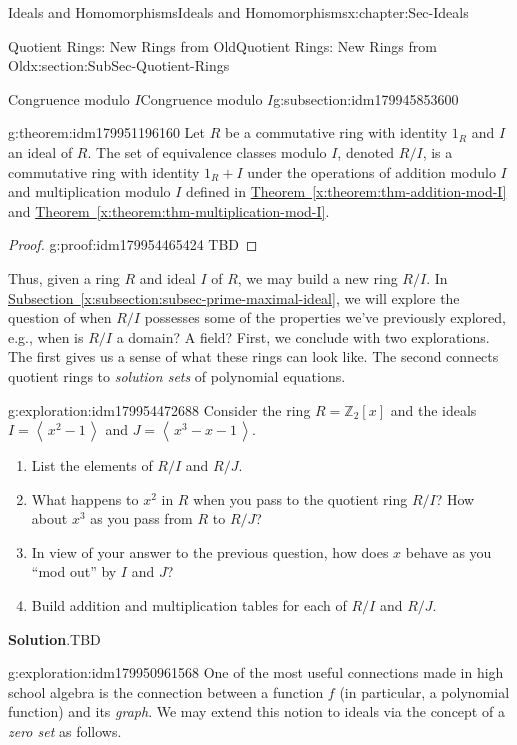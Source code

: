 \documentclass[oneside,10pt,]{book}
\newcommand{\blocktitlefont}{\relax}
\newcommand{\xreffont}{\relax}
\numberwithin{equation}{section}
\newcommand{\ideal}[1]{\left\langle\, #1 \,\right\rangle}
\def\Z{{\mathbb Z}}
\begin{document}
\begin{chapterptx}{Ideals and Homomorphisms}{}{Ideals and Homomorphisms}{}{}{x:chapter:Sec-Ideals}
\begin{sectionptx}{Quotient Rings: New Rings from Old}{}{Quotient Rings: New Rings from Old}{}{}{x:section:SubSec-Quotient-Rings}
\begin{subsectionptx}{Congruence modulo \(I\)}{}{Congruence modulo \(I\)}{}{}{g:subsection:idm179945853600}
\begin{theorem}{}{}{g:theorem:idm179951196160}%
%
Let \(R\) be a commutative ring with identity \(1_R\) and \(I\) an ideal of \(R\). The set of equivalence classes modulo \(I\), denoted \(R/I\), is a commutative ring with identity \(1_R + I\) under the operations of addition modulo \(I\) and multiplication modulo \(I\) defined in \hyperref[x:theorem:thm-addition-mod-I]{Theorem~{\xreffont\ref{x:theorem:thm-addition-mod-I}}} and \hyperref[x:theorem:thm-multiplication-mod-I]{Theorem~{\xreffont\ref{x:theorem:thm-multiplication-mod-I}}}.%
\end{theorem}
\begin{proof}{}{g:proof:idm179954465424}
TBD\end{proof}
Thus, given a ring \(R\) and ideal \(I\) of \(R\), we may build a new ring \(R/I\). In \hyperref[x:subsection:subsec-prime-maximal-ideal]{Subsection~{\xreffont\ref{x:subsection:subsec-prime-maximal-ideal}}}, we will explore the question of when \(R/I\) possesses some of the properties we've previously explored, e.g., when is \(R/I\) a domain? A field? First, we conclude with two explorations. The first gives us a sense of what these rings can look like. The second connects quotient rings to \emph{solution sets} of polynomial equations.%
\begin{exploration}{}{g:exploration:idm179954472688}%
Consider the ring \(R=\Z_2[x]\) and the ideals \(I = \ideal{x^2-1}\) and \(J = \ideal{x^3 -x -1}\).%
%
\begin{enumerate}
\item{}List the elements of \(R/I\) and \(R/J\).%
\item{}What happens to \(x^2\) in \(R\) when you pass to the quotient ring \(R/I\)? How about \(x^3\) as you pass from \(R\) to \(R/J\)?%
\item{}In view of your answer to the previous question, how does \(x\) behave as you ``mod out'' by \(I\) and \(J\)?%
\item{}Build addition and multiplication tables for each of \(R/I\) and \(R/J\).%
\end{enumerate}
\par\smallskip%
\noindent\textbf{\blocktitlefont Solution}.\hypertarget{g:solution:idm179951158464}{}\quad{}TBD\end{exploration}
\begin{exploration}{}{g:exploration:idm179950961568}%
One of the most useful connections made in high school algebra is the connection between a function \(f\) (in particular, a polynomial function) and its \emph{graph}. We may extend this notion to ideals via the concept of a \emph{zero set} as follows.%

\end{exploration}
\end{subsectionptx}
\end{sectionptx}
\end{chapterptx}
\end{document}
